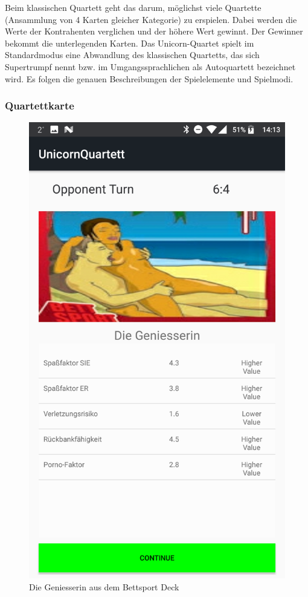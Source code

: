 \documentclass{scrartcl}
\begin{document}
Beim klassischen Quartett geht das darum, möglichst viele Quartette (Ansammlung von 4 Karten gleicher Kategorie) zu erspielen.
Dabei werden die Werte der Kontrahenten verglichen und der höhere Wert gewinnt. Der Gewinner bekommt die unterlegenden Karten.
Das Unicorn-Quartet spielt im Standardmodus eine Abwandlung des klassischen Quartetts, das sich Supertrumpf nennt bzw. im Umgangssprachlichen als
Autoquartett  bezeichnet wird. Es folgen die genauen Beschreibungen der Spielelemente und Spielmodi.
\subsubsection{Quartettkarte}

\begin{figure}[!ht]
\begin{center} 
\includegraphics[scale=0.1]{pics/QuartettKarte.png}
    \caption{Die Geniesserin  aus dem Bettsport Deck}
\end{center}
\end{figure}
\end{document}
